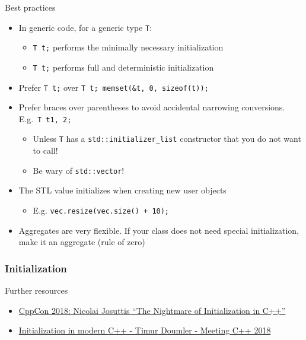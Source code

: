 \begin{frame}[fragile]
  \begin{exampleblock}{Best practices}
    \begin{itemize}
      \item In generic code, for a generic type \texttt{T}:
      \begin{itemize}
        \item \texttt{T t;} performs the minimally necessary initialization
        \item \texttt{T t{};} performs full and deterministic initialization
      \end{itemize}
      \item Prefer \texttt{T t{};} over \texttt{T t; memset(&t, 0, sizeof(t));}
      \item Prefer braces over parentheses to avoid accidental narrowing conversions. E.g.\ \texttt{T t{1, 2};}
      \begin{itemize}
        \item Unless \texttt{T} has a \texttt{std::initializer_list} constructor that you do not want to call!
        \item Be wary of \texttt{std::vector}!
      \end{itemize}
      \item The STL value initializes when creating new user objects
      \begin{itemize}
        \item E.g. \texttt{vec.resize(vec.size() + 10);}
      \end{itemize}
      \item Aggregates are very flexible. If your class does not need special initialization, make it an aggregate (rule of zero)
    \end{itemize}
  \end{exampleblock}
\end{frame}

\begin{frame}[fragile]
  \frametitle{Initialization}
  \begin{block}{Further resources}
    \begin{itemize}
      \item \href{https://www.youtube.com/watch?v=7DTlWPgX6zs}{CppCon 2018: Nicolai Josuttis “The Nightmare of Initialization in C++”}
      \item \href{https://www.youtube.com/watch?v=ZfP4VAK21zc}{Initialization in modern C++ - Timur Doumler - Meeting C++ 2018}
    \end{itemize}
  \end{block}
\end{frame}
